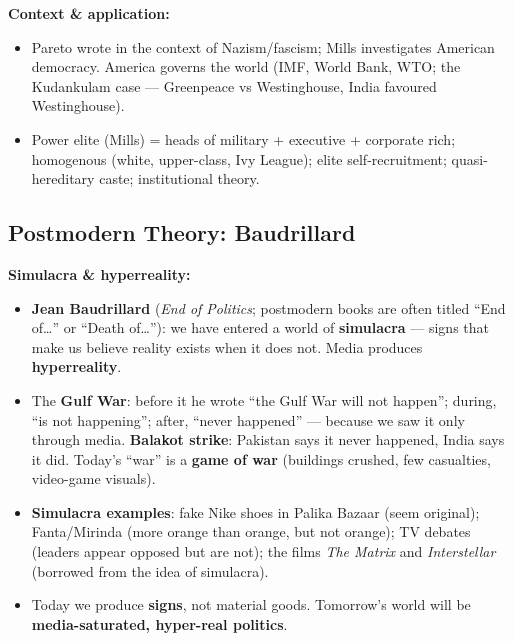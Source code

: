 \begin{CriticalPoint}
\textbf{Context \& application:}
\begin{itemize}
\item Pareto wrote in the context of Nazism/fascism; Mills investigates American democracy. America governs the world (IMF, World Bank, WTO; the Kudankulam case --- Greenpeace vs Westinghouse, India favoured Westinghouse).
\end{itemize}
\end{CriticalPoint}

\begin{QuickRevision}
\begin{itemize}
\item Power elite (Mills) = heads of military + executive + corporate rich; homogenous (white, upper-class, Ivy League); elite self-recruitment; quasi-hereditary caste; institutional theory.
\end{itemize}
\end{QuickRevision}

\sectiondivider

\subsection{Postmodern Theory: Baudrillard}

\begin{KeyConcept}
\textbf{Simulacra \& hyperreality:}
\begin{itemize}
\item \textbf{Jean Baudrillard} (\textit{End of Politics}; postmodern books are often titled ``End of\dots'' or ``Death of\dots''): we have entered a world of \textbf{simulacra} --- signs that make us believe reality exists when it does not. Media produces \textbf{hyperreality}.
\item The \textbf{Gulf War}: before it he wrote ``the Gulf War will not happen''; during, ``is not happening''; after, ``never happened'' --- because we saw it only through media. \textbf{Balakot strike}: Pakistan says it never happened, India says it did. Today's ``war'' is a \textbf{game of war} (buildings crushed, few casualties, video-game visuals).
\item \textbf{Simulacra examples}: fake Nike shoes in Palika Bazaar (seem original); Fanta/Mirinda (more orange than orange, but not orange); TV debates (leaders appear opposed but are not); the films \textit{The Matrix} and \textit{Interstellar} (borrowed from the idea of simulacra).
\item Today we produce \textbf{signs}, not material goods. Tomorrow's world will be \textbf{media-saturated, hyper-real politics}.
\end{itemize}
\end{KeyConcept}

